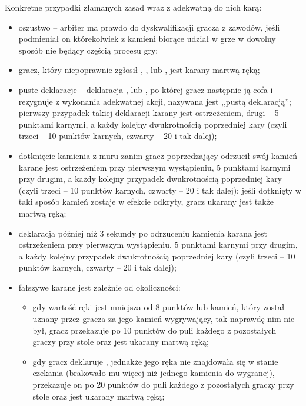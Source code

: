 Konkretne przypadki złamanych zasad wraz z adekwatną do nich karą:
\begin{itemize}
  \item oszustwo -- arbiter ma prawdo do dyskwalifikacji gracza z zawodów, jeśli
  podmieniał on którekolwiek z kamieni biorące udział w grze w dowolny sposób
  nie będący częścią procesu gry;
  \item gracz, który niepoprawnie zgłosił , ,
   lub , jest karany martwą ręką;
  \item puste deklaracje -- deklaracja , 
  lub , po której gracz następnie ją cofa i rezygnuje z wykonania
  adekwatnej akcji, nazywana jest ,,pustą deklaracją''; pierwszy przypadek
  takiej deklaracji karany jest ostrzeżeniem, drugi -- 5 punktami karnymi, a
  każdy kolejny dwukrotnością poprzedniej kary (czyli trzeci -- 10 punktów
  karnych, czwarty -- 20 i tak dalej);
  \item dotknięcie kamienia z muru zanim gracz poprzedzający odrzucił swój
  kamień karane jest ostrzeżeniem przy pierwszym wystąpieniu, 5 punktami karnymi
  przy drugim, a każdy kolejny przypadek dwukrotnością poprzedniej kary (czyli
  trzeci -- 10 punktów karnych, czwarty -- 20 i tak dalej); jeśli dotknięty w
  taki sposób kamień zostaje w efekcie odkryty, gracz ukarany jest także martwą ręką;
  \item deklaracja  później niż 3 sekundy po odrzuceniu kamienia
  karana jest ostrzeżeniem przy pierwszym wystąpieniu, 5 punktami karnymi
  przy drugim, a każdy kolejny przypadek dwukrotnością poprzedniej kary (czyli
  trzeci -- 10 punktów karnych, czwarty -- 20 i tak dalej);
  \item fałszywe  karane jest zależnie od okoliczności:
  	\begin{itemize}
  	  \item gdy wartość ręki jest mniejsza od 8 punktów lub kamień, który został
  	  uznany przez gracza za jego kamień wygrywający, tak naprawdę nim nie był,
  	  gracz przekazuje po 10 punktów do puli każdego z pozostałych graczy przy
  	  stole oraz jest ukarany martwą ręką;
  	  \item gdy gracz deklaruje , jednakże jego ręka nie znajdowała
  	  się w stanie czekania (brakowało mu więcej niż jednego kamienia do
  	  wygranej), przekazuje on po 20 punktów do puli każdego z pozostałych graczy
  	  przy stole oraz jest ukarany martwą ręką;
  	\end{itemize}

\end{itemize}
